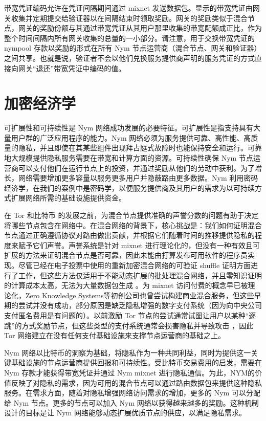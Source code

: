 \documentclass{article}
\begin{document}
	带宽凭证编码允许在凭证间隔期间通过 mixnet 发送数据包。显示的带宽凭证由网关收集并定期提交给验证器以在间隔结束时领取奖励。网关的奖励类似于混合节点，网关的奖励份额与其通过带宽凭证从其用户那里收集的带宽配额成正比，作为整个时间间隔内所有网关收集的总量的一小部分。请注意，用于交换带宽凭证的 nympool 存款以奖励的形式在所有 Nym 节点运营商（混合节点、网关和验证器）之间共享。也就是说，验证者不会以他们兑换服务提供商声明的服务凭证的方式直接向网关“退还”带宽凭证中编码的值。\newline

	\section{加密经济学}

	可扩展性和可持续性是 Nym 网络成功发展的必要特征。可扩展性是指支持具有大量用户群的广泛应用程序的能力。Nym 网络必须为服务提供可靠、高性能、高质量的隐私，并且即使在其某些组件出现拜占庭式故障时也能保持安全和运行。可靠地大规模提供隐私服务需要在带宽和计算方面的资源。可持续性确保 Nym 节点运营商可以支付他们在运行节点上的投资，并通过奖励从他们的劳动中获利。为了增长，网络需要增加更多容量以服务更多用户并隐蔽路由更多数据。Nym 利用密码经济学，在我们的案例中是密码学，以便服务提供商及其用户的需求为以可持续方式扩展网络所需的基础设施提供资金\cite{ref2}。\newline

	在 Tor 和比特币 \cite{ref40} 的发展之前，为混合节点提供准确的声誉分数的问题有助于决定将哪些节点包含在网络中。在混合网络的背景下，核心挑战是：我们如何证明混合节点通过正确遵循协议对路由做出贡献，并根据它们随着时间的推移提供隐私的程度来赋予它们声誉。声誉系统是针对 mixnet 进行理论化的，但没有一种有效且可扩展的方法来证明混合节点是否可靠，因此未能由打算发布可用软件的程序员实现\cite{ref44}。尽管已经在电子投票中使用的重新加密混合网络的可验证 shuffle 证明方面进行了工作，但这些方法仅适用于不能动态扩展的批处理混合网络，并且零知识证明的计算成本太高，无法为大量数据包生成 \cite{ref4}。为 mixnet 访问付费的概念早已被理论化\cite{ref47}，Zero Knowledge Systems等初创公司也曾尝试构建商业混合服务\cite{ref48}，但这些早期的尝试并没有成功，部分原因是缺乏隐私增强的数字支付系统（因为向中央公司支付匿名费用是有问题的）。以前激励 Tor 节点的尝试通常试图让用户以某种“逐跳”的方式奖励节点\cite{ref60}，但这些类型的支付系统通常会损害隐私并导致攻击 \cite{ref64, ref91}，因此 Tor 网络建立在没有任何支付基础设施来支撑节点运营商的基础之上。\newline

	Nym 网络以比特币的洞察为基础，将隐私作为一种共同利益，同时为提供这一关键基础设施的节点运营商提供回报和可持续性。受比特币交易费用的启发，需要在 Nym 存款才能获得带宽凭证并通过 Nym mixnet 进行隐私通信。为此，NYM的价值反映了对隐私的需求，因为可用的混合节点可以通过路由数据包来提供这种隐私服务。在需求方面，随着对隐私增强网络访问需求的增加，更多的 Nym 可以分配给 Nym 节点。更多的节点可以加入 Nym 网络以获得越来越多的奖励。这种机制设计的目标是让 Nym 网络能够动态扩展优质节点的供应，以满足隐私需求。\newline
\end{document}
